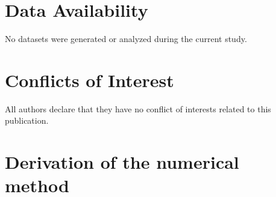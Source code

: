 \documentclass{article}
\begin{document}
\section*{Data Availability}
No datasets were generated or analyzed during the current study.

\section*{Conflicts of Interest }
All authors declare that they have no conflict of interests related to this publication.






\appendix

\section{Derivation of the numerical method}\label{AppNumerics}
\end{document}
